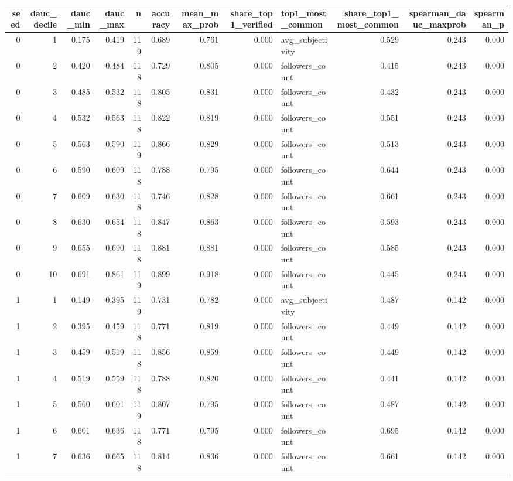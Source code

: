 \begin{tabular}{rrrrrrrrlrrr}
\toprule
seed & dauc_decile & dauc_min & dauc_max & n & accuracy & mean_max_prob & share_top1_verified & top1_most_common & share_top1_most_common & spearman_dauc_maxprob & spearman_p \\
\midrule
0 & 1 & 0.175 & 0.419 & 119 & 0.689 & 0.761 & 0.000 & avg_subjectivity & 0.529 & 0.243 & 0.000 \\
0 & 2 & 0.420 & 0.484 & 118 & 0.729 & 0.805 & 0.000 & followers_count & 0.415 & 0.243 & 0.000 \\
0 & 3 & 0.485 & 0.532 & 118 & 0.805 & 0.831 & 0.000 & followers_count & 0.432 & 0.243 & 0.000 \\
0 & 4 & 0.532 & 0.563 & 118 & 0.822 & 0.819 & 0.000 & followers_count & 0.551 & 0.243 & 0.000 \\
0 & 5 & 0.563 & 0.590 & 119 & 0.866 & 0.829 & 0.000 & followers_count & 0.513 & 0.243 & 0.000 \\
0 & 6 & 0.590 & 0.609 & 118 & 0.788 & 0.795 & 0.000 & followers_count & 0.644 & 0.243 & 0.000 \\
0 & 7 & 0.609 & 0.630 & 118 & 0.746 & 0.828 & 0.000 & followers_count & 0.661 & 0.243 & 0.000 \\
0 & 8 & 0.630 & 0.654 & 118 & 0.847 & 0.863 & 0.000 & followers_count & 0.593 & 0.243 & 0.000 \\
0 & 9 & 0.655 & 0.690 & 118 & 0.881 & 0.881 & 0.000 & followers_count & 0.585 & 0.243 & 0.000 \\
0 & 10 & 0.691 & 0.861 & 119 & 0.899 & 0.918 & 0.000 & followers_count & 0.445 & 0.243 & 0.000 \\
1 & 1 & 0.149 & 0.395 & 119 & 0.731 & 0.782 & 0.000 & avg_subjectivity & 0.487 & 0.142 & 0.000 \\
1 & 2 & 0.395 & 0.459 & 118 & 0.771 & 0.819 & 0.000 & followers_count & 0.449 & 0.142 & 0.000 \\
1 & 3 & 0.459 & 0.519 & 118 & 0.856 & 0.859 & 0.000 & followers_count & 0.449 & 0.142 & 0.000 \\
1 & 4 & 0.519 & 0.559 & 118 & 0.788 & 0.820 & 0.000 & followers_count & 0.441 & 0.142 & 0.000 \\
1 & 5 & 0.560 & 0.601 & 119 & 0.807 & 0.795 & 0.000 & followers_count & 0.487 & 0.142 & 0.000 \\
1 & 6 & 0.601 & 0.636 & 118 & 0.771 & 0.795 & 0.000 & followers_count & 0.695 & 0.142 & 0.000 \\
1 & 7 & 0.636 & 0.665 & 118 & 0.814 & 0.836 & 0.000 & followers_count & 0.661 & 0.142 & 0.000 \\

\end{tabular}
